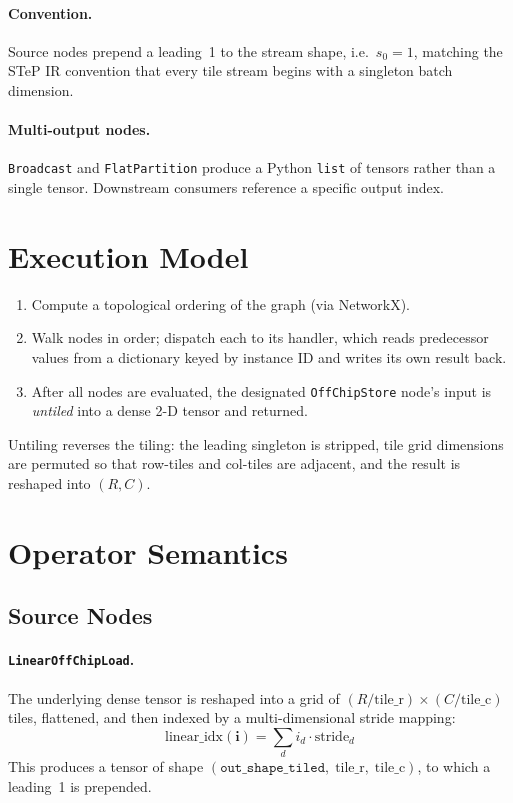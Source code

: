 \documentclass[11pt]{article}
\begin{document}
\paragraph{Convention.} Source nodes prepend a leading~1 to the stream shape, i.e.\ $s_0 = 1$, matching the STeP IR convention that every tile stream begins with a singleton batch dimension.

\paragraph{Multi-output nodes.} \texttt{Broadcast} and \texttt{FlatPartition} produce a Python \texttt{list} of tensors rather than a single tensor.
Downstream consumers reference a specific output index.

\section{Execution Model}

\begin{enumerate}[leftmargin=*]
  \item Compute a topological ordering of the graph (via NetworkX).
  \item Walk nodes in order; dispatch each to its handler, which reads predecessor values from a dictionary keyed by instance ID and writes its own result back.
  \item After all nodes are evaluated, the designated \texttt{OffChipStore} node's input is \emph{untiled} into a dense 2-D tensor and returned.
\end{enumerate}

\noindent Untiling reverses the tiling: the leading singleton is stripped, tile grid dimensions are permuted so that row-tiles and col-tiles are adjacent, and the result is reshaped into $(R, C)$.

\section{Operator Semantics}

\subsection{Source Nodes}

\paragraph{\texttt{LinearOffChipLoad}.}
The underlying dense tensor is reshaped into a grid of $(R/\text{tile\_r}) \times (C/\text{tile\_c})$ tiles, flattened, and then indexed by a multi-dimensional stride mapping:
\[
  \text{linear\_idx}(\mathbf{i}) = \sum_{d} i_d \cdot \text{stride}_d
\]
This produces a tensor of shape $(\texttt{out\_shape\_tiled},\;\text{tile\_r},\;\text{tile\_c})$, to which a leading~1 is prepended.
\end{document}
